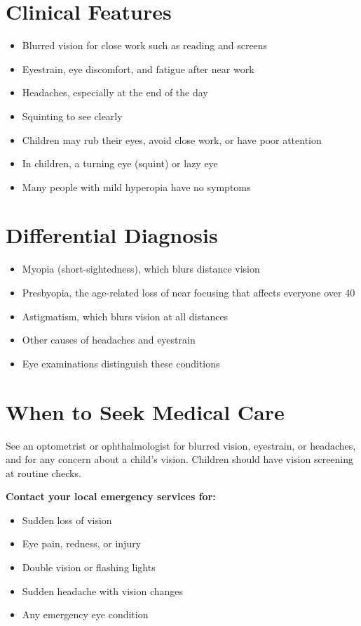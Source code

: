 \section*{Clinical Features}
\begin{itemize}
    \item Blurred vision for close work such as reading and screens
    \item Eyestrain, eye discomfort, and fatigue after near work
    \item Headaches, especially at the end of the day
    \item Squinting to see clearly
    \item Children may rub their eyes, avoid close work, or have poor attention
    \item In children, a turning eye (squint) or lazy eye
    \item Many people with mild hyperopia have no symptoms
\end{itemize}

\section*{Differential Diagnosis}
\begin{itemize}
    \item Myopia (short-sightedness), which blurs distance vision
    \item Presbyopia, the age-related loss of near focusing that affects everyone over 40
    \item Astigmatism, which blurs vision at all distances
    \item Other causes of headaches and eyestrain
    \item Eye examinations distinguish these conditions
\end{itemize}

\section*{When to Seek Medical Care}
See an optometrist or ophthalmologist for blurred vision, eyestrain, or headaches, and for any concern about a child's vision. Children should have vision screening at routine checks.

\textbf{Contact your local emergency services for:}
\begin{itemize}
    \item Sudden loss of vision
    \item Eye pain, redness, or injury
    \item Double vision or flashing lights
    \item Sudden headache with vision changes
    \item Any emergency eye condition
\end{itemize}

